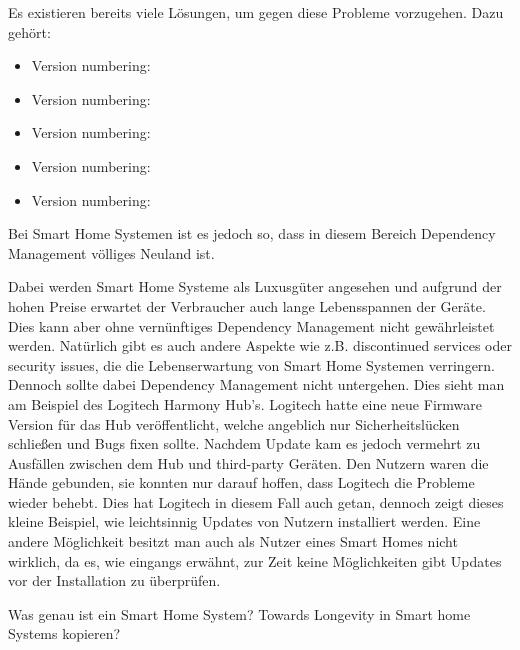 Es existieren bereits viele Lösungen, um gegen diese Probleme vorzugehen. Dazu gehört:
\begin{itemize}
\item Version numbering: 
\item Version numbering: 
\item Version numbering: 
\item Version numbering: 
\item Version numbering: 
\end{itemize}

Bei Smart Home Systemen ist es jedoch so, dass in diesem Bereich Dependency Management völliges Neuland ist.

Dabei werden Smart Home Systeme als 
Luxusgüter angesehen und aufgrund der hohen Preise erwartet der Verbraucher auch lange Lebensspannen der Geräte.
Dies kann aber ohne vernünftiges Dependency Management nicht gewährleistet werden. Natürlich gibt es auch andere Aspekte wie z.B. 
discontinued services oder security issues, die die Lebenserwartung von Smart Home Systemen verringern. Dennoch sollte 
dabei Dependency Management nicht untergehen. Dies sieht man am Beispiel des Logitech Harmony Hub's. Logitech hatte eine 
neue Firmware Version für das Hub veröffentlicht, welche angeblich nur Sicherheitslücken schließen und Bugs fixen sollte.
Nachdem Update kam es jedoch vermehrt zu Ausfällen zwischen dem Hub und third-party Geräten. Den Nutzern waren die Hände 
gebunden, sie konnten nur darauf hoffen, dass Logitech die Probleme wieder behebt. Dies hat Logitech in diesem Fall auch getan,
dennoch zeigt dieses kleine Beispiel, wie leichtsinnig Updates von Nutzern installiert werden. Eine andere Möglichkeit besitzt man auch als 
Nutzer eines Smart Homes nicht wirklich, da es, wie eingangs erwähnt, zur Zeit keine Möglichkeiten gibt Updates vor der Installation zu 
überprüfen. 



 
Was genau ist ein Smart Home System? Towards Longevity in Smart home Systems kopieren?










